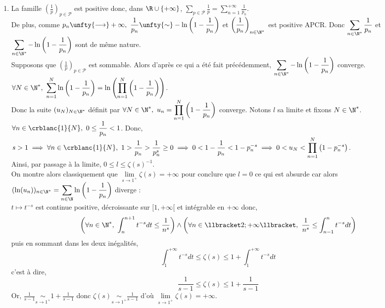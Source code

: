 \documentclass[8pt]{book}
\begin{document}
\begin{enumerate}
		\item La famille $\left(\displaystyle\frac{1}{p}\right)_{p\in \mathcal{P}}$ est positive donc, dans $\R\cup\{+\infty\}$, $\displaystyle\sum\limits_{p\in \mathcal{P}}\frac{1}{p}=\sum\limits_{n=1}^{+\infty}\frac{1}{p_n}$.\\
		De plus, comme $p_n\unfty{\longrightarrow}+\infty,\ \displaystyle\frac{1}{p_n}\unfty{\sim}-\ln\left(1-\frac{1}{p_n}\right)$ et $\left(\displaystyle\frac{1}{p_n}\right)_{n\in \N^*}$ est positive APCR. Donc $\displaystyle\sum\limits_{n\in \N^*}\frac{1}{p_n}$ et $\displaystyle\sum\limits_{n\in \N^*}-\ln\left(1-\frac{1}{p_n}\right)$ sont de même nature.\\
		Supposons que $\left(\displaystyle\frac{1}{p}\right)_{p\in \mathcal{P}}$ est sommable. Alors d'après ce qui a été fait précédemment, $\displaystyle\sum\limits_{n\in \N^*}-\ln\left(1-\frac{1}{p_n}\right)$ converge.\\
		$\forall N\in \N^*,\ \displaystyle\sum\limits_{n=1}^N\ln\left(1-\frac{1}{p_n}\right)=\ln\left(\prod\limits_{n=1}^{N}\left(1-\frac{1}{p_n}\right)\right)$.\\
		Donc la suite $(u_N)_{N\in \N^*}$ définit par $\forall N\in \N^*,\ u_n=\displaystyle\prod\limits_{n=1}^{N}\left(1-\frac{1}{p_n}\right)$ converge. Notons $l$ sa limite et fixons $N\in \N^*$. $\forall n\in \crblanc{1}{N},\ 0\leq \displaystyle\frac{1}{p_n}<1$. Donc, $s>1\implies \forall n\in \crblanc{1}{N},\ 1>\displaystyle\frac{1}{p_n}>\frac{1}{p_n^s}\geq 0\implies 0<1-\frac{1}{p_n}<1-p_n^{-s}\implies 0<u_N<\prod\limits_{n=1}^N\left(1-p_n^{-s}\right)$.\\
		Ainsi, par passage à la limite, $0\leq l\leq \zeta(s)^{-1}$.\\
		On montre alors classiquement que $\underset{s\to 1^+}{\lim}\zeta(s)=+\infty$ pour conclure que $l=0$ ce qui est absurde car alors $(\ln(u_n))_{n\in \N^*}=\displaystyle\sum\limits_{n\in \N}\ln\left(1-\frac{1}{p_n}\right)$ diverge :\\
		$t\mapsto t^{-s}$ est continue positive, décroissante sur $[1,+\infty[$ et intégrable en $+\infty$ donc,\\
		$$\left(\forall n\in \N^*,\ \int_n^{n+1}t^{-s}dt\leq \frac{1}{n^s}\right)\land\left(\forall n\in \llbracket2;+\infty\llbracket,\ \frac{1}{n^s}\leq \int_{n-1}^n t^{-s}dt\right)$$
		puis en sommant dans les deux inégalités,\\
		$$\int_1^{+\infty}t^{-s}dt\leq \zeta(s)\leq 1+\int_{1}^{+\infty}t^{-s}dt$$
		c'est à dire,\\
		$$\frac{1}{s-1}\leq \zeta(s)\leq 1+\frac{1}{s-1}$$
		Or, $\displaystyle\frac{1}{s-1}\underset{s\to 1^+}{\sim}1+\frac{1}{s-1}$ donc $\zeta(s)\underset{s\to 1^+}{\sim}\displaystyle\frac{1}{s-1}$ d'où $\underset{s\to 1^+}{\lim}\zeta(s)=+\infty$.
	\end{enumerate}
	
\end{document}

